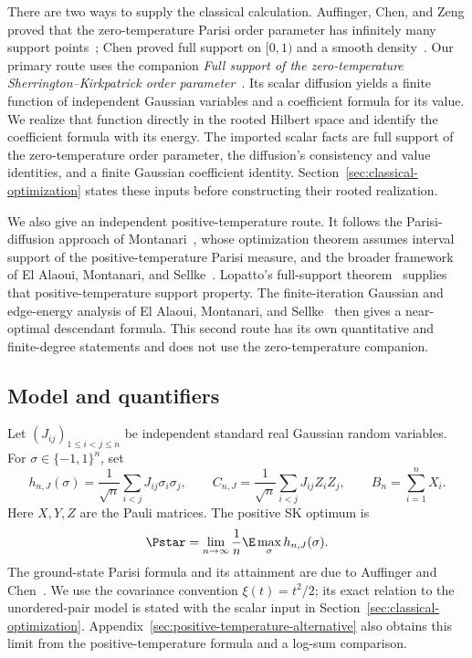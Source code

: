 There are two ways to supply the classical calculation. Auffinger,
Chen, and Zeng proved that the zero-temperature Parisi order parameter
has infinitely many support points~\cite[Theorem~1]{ACZ2020}; Chen
proved full support on $[0,1)$ and a smooth
density~\cite[Theorem~1.3]{Chen2026}.
Our primary route uses the companion
\emph{Full support of the zero-temperature Sherrington--Kirkpatrick
order parameter}~\cite{SKSupport2026}. Its scalar diffusion yields a
finite function of independent Gaussian variables and a coefficient
formula for its value. We realize that function directly in the
rooted Hilbert space and identify the coefficient formula with its
energy. The imported scalar facts are full support of the zero-temperature
order parameter, the diffusion's consistency and value identities,
and a finite Gaussian coefficient identity.
Section~\ref{sec:classical-optimization} states these inputs before
constructing their rooted realization.

We also give an independent positive-temperature route.
It follows the Parisi-diffusion approach of
Montanari~\cite{Montanari2019}, whose optimization theorem assumes
interval support of the positive-temperature Parisi measure, and the
broader framework of El Alaoui, Montanari, and Sellke~\cite{AMS2020}.
Lopatto's full-support theorem~\cite{Lopatto2026} supplies that
positive-temperature support property. The finite-iteration
Gaussian and edge-energy analysis of El Alaoui, Montanari, and
Sellke~\cite{EAMS2023} then gives a near-optimal descendant formula.
This second route has its own quantitative and finite-degree
statements and does not use the zero-temperature companion.

\subsection{Model and quantifiers}

Let $(J_{ij})_{1\le i<j\le n}$ be independent standard real Gaussian random
variables. For $\sigma\in\{-1,1\}^n$, set
\begin{equation}\label{eq:sk-model}
 h_{n,J}(\sigma)=\frac1{\sqrt n}\sum_{i<j}J_{ij}\sigma_i\sigma_j,
 \qquad
 C_{n,J}=\frac1{\sqrt n}\sum_{i<j}J_{ij}Z_iZ_j,
 \qquad B_n=\sum_{i=1}^nX_i.
\end{equation}
Here $X,Y,Z$ are the Pauli matrices. The positive SK optimum is
\begin{equation}\label{eq:parisi-constant}
 \Pstar=\lim_{n\to\infty}\frac1n\E\max_{\sigma}h_{n,J}(\sigma).
\end{equation}
The ground-state Parisi formula and its attainment are due to
Auffinger and Chen~\cite{AC2017}. We use the covariance convention
$\xi(t)=t^2/2$; its exact relation to the unordered-pair model is
stated with the scalar input in Section~\ref{sec:classical-optimization}.
Appendix~\ref{sec:positive-temperature-alternative} also obtains this
limit from the positive-temperature formula and a log-sum comparison.

